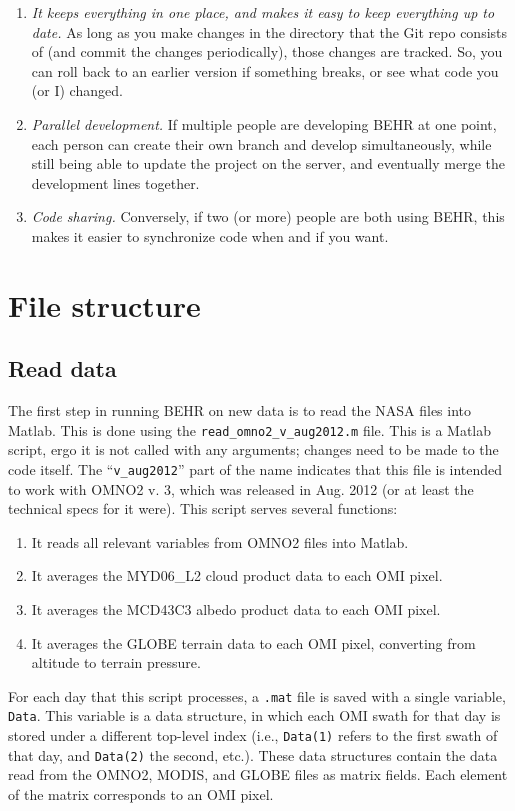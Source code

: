 \documentclass[12pt]{article}
\begin{document}
	\begin{enumerate}
	 \item \emph{It keeps everything in one place, and makes it easy to keep everything up to date.} As long as you make changes in the directory that the Git repo consists of (and commit the changes periodically), those changes are tracked.  So, you can roll back to an earlier version if something breaks, or see what code you (or I) changed.
	 \item \emph{Parallel development.}  If multiple people are developing BEHR at one point, each person can create their own branch and develop simultaneously, while still being able to update the project on the server, and eventually merge the development lines together.
	 \item \emph{Code sharing.} Conversely, if two (or more) people are both using BEHR, this makes it easier to synchronize code when and if you want.
	\end{enumerate}

\section{File structure}
	\subsection{Read data}
	
	The first step in running BEHR on new data is to read the NASA files into Matlab.  This is done using the {\lstinline[breaklines=true]|read_omno2_v_aug2012.m|} file.  This is a Matlab script, ergo it is not called with any arguments; changes need to be made to the code itself. The ``{\lstinline[breaklines=true]|v_aug2012|}'' part of the name indicates that this file is intended to work with OMNO2 v. 3, which was released in Aug. 2012 (or at least the technical specs for it were).  This script serves several functions: 
		\begin{enumerate}
 		 \item It reads all relevant variables from OMNO2 files into Matlab.
		 \item It averages the MYD06\_L2 cloud product data to each OMI pixel.
		 \item It averages the MCD43C3 albedo product data to each OMI pixel.
		 \item It averages the GLOBE terrain data to each OMI pixel, converting from altitude to terrain pressure.
		\end{enumerate}
	For each day that this script processes, a {\lstinline[breaklines=true]|.mat|} file is saved with a single variable, {\lstinline[breaklines=true]|Data|}.  This variable is a data structure, in which each OMI swath for that day is stored under a different top-level index (i.e., {\lstinline[breaklines=true]|Data(1)|} refers to the first swath of that day, and {\lstinline[breaklines=true]|Data(2)|} the second, etc.).  These data structures contain the data read from the OMNO2, MODIS, and GLOBE files as matrix fields.  Each element of the matrix corresponds to an OMI pixel.
	
\end{document}
